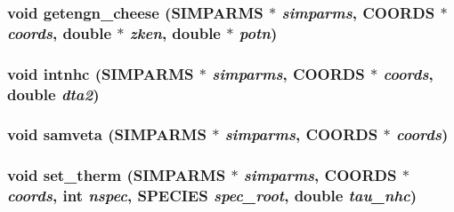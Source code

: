 \subsubsection{\setlength{\rightskip}{0pt plus 5cm}void getengn\_\-cheese ({\bf SIMPARMS} $\ast$ {\em simparms}, {\bf COORDS} $\ast$ {\em coords}, double $\ast$ {\em zken}, double $\ast$ {\em potn})}\label{thomas_2md__therm_8c_53d83b2112359e7e2d19fcd50a15b99f}


\subsubsection{\setlength{\rightskip}{0pt plus 5cm}void intnhc ({\bf SIMPARMS} $\ast$ {\em simparms}, {\bf COORDS} $\ast$ {\em coords}, double {\em dta2})}\label{thomas_2md__therm_8c_13b91fe3a0c7763d9a122c7de7ce0242}


\subsubsection{\setlength{\rightskip}{0pt plus 5cm}void samveta ({\bf SIMPARMS} $\ast$ {\em simparms}, {\bf COORDS} $\ast$ {\em coords})}\label{thomas_2md__therm_8c_dce71660db00c62c34960b883a2b7422}


\subsubsection{\setlength{\rightskip}{0pt plus 5cm}void set\_\-therm ({\bf SIMPARMS} $\ast$ {\em simparms}, {\bf COORDS} $\ast$ {\em coords}, int {\em nspec}, {\bf SPECIES} {\em spec\_\-root}, double {\em tau\_\-nhc})}\label{thomas_2md__therm_8c_f4c4bc56999c6628aa2bb363b490d32e}


